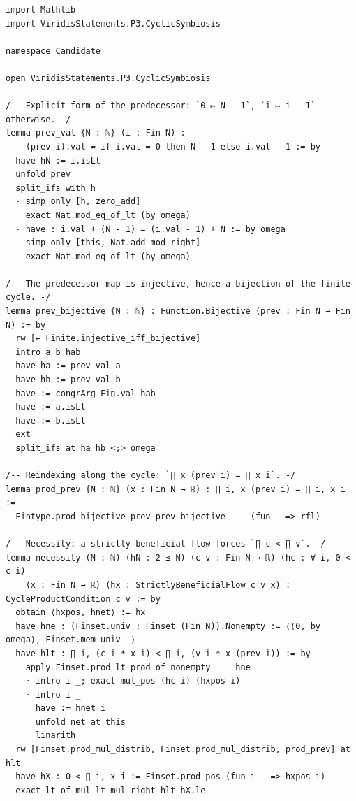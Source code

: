 \documentclass[11pt]{article}
\theoremstyle{definition}
\theoremstyle{remark}
\begin{document}
\begin{lstlisting}[caption={The complete candidate proof \texttt{proofs/P3.CyclicSymbiosis.lean}.}]
import Mathlib
import ViridisStatements.P3.CyclicSymbiosis

namespace Candidate

open ViridisStatements.P3.CyclicSymbiosis

/-- Explicit form of the predecessor: `0 ↦ N - 1`, `i ↦ i - 1` otherwise. -/
lemma prev_val {N : ℕ} (i : Fin N) :
    (prev i).val = if i.val = 0 then N - 1 else i.val - 1 := by
  have hN := i.isLt
  unfold prev
  split_ifs with h
  · simp only [h, zero_add]
    exact Nat.mod_eq_of_lt (by omega)
  · have : i.val + (N - 1) = (i.val - 1) + N := by omega
    simp only [this, Nat.add_mod_right]
    exact Nat.mod_eq_of_lt (by omega)

/-- The predecessor map is injective, hence a bijection of the finite cycle. -/
lemma prev_bijective {N : ℕ} : Function.Bijective (prev : Fin N → Fin N) := by
  rw [← Finite.injective_iff_bijective]
  intro a b hab
  have ha := prev_val a
  have hb := prev_val b
  have := congrArg Fin.val hab
  have := a.isLt
  have := b.isLt
  ext
  split_ifs at ha hb <;> omega

/-- Reindexing along the cycle: `∏ x (prev i) = ∏ x i`. -/
lemma prod_prev {N : ℕ} (x : Fin N → ℝ) : ∏ i, x (prev i) = ∏ i, x i :=
  Fintype.prod_bijective prev prev_bijective _ _ (fun _ => rfl)

/-- Necessity: a strictly beneficial flow forces `∏ c < ∏ v`. -/
lemma necessity (N : ℕ) (hN : 2 ≤ N) (c v : Fin N → ℝ) (hc : ∀ i, 0 < c i)
    (x : Fin N → ℝ) (hx : StrictlyBeneficialFlow c v x) : CycleProductCondition c v := by
  obtain ⟨hxpos, hnet⟩ := hx
  have hne : (Finset.univ : Finset (Fin N)).Nonempty := ⟨⟨0, by omega⟩, Finset.mem_univ _⟩
  have hlt : ∏ i, (c i * x i) < ∏ i, (v i * x (prev i)) := by
    apply Finset.prod_lt_prod_of_nonempty _ _ hne
    · intro i _; exact mul_pos (hc i) (hxpos i)
    · intro i _
      have := hnet i
      unfold net at this
      linarith
  rw [Finset.prod_mul_distrib, Finset.prod_mul_distrib, prod_prev] at hlt
  have hX : 0 < ∏ i, x i := Finset.prod_pos (fun i _ => hxpos i)
  exact lt_of_mul_lt_mul_right hlt hX.le


\end{lstlisting}
\end{document}
